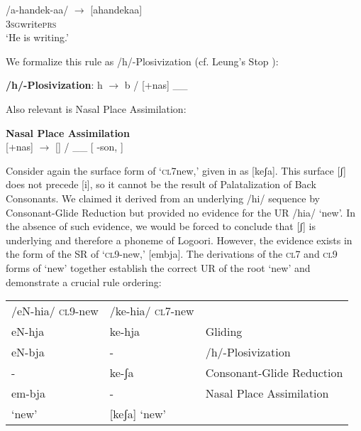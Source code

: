 \documentclass[output=paper]{langsci/langscibook}
\begin{document}
\ex\label{ex:glewwe:14c}{}
/a-handek-aa/  $\rightarrow$  [ahandekaa]\\{}
\textsc{3sg}write\textsc{prs}\\{}
\glt ‘He is writing.’
\z
\z 

We formalize this rule as /h/-Plosivization (cf. Leung’s Stop \citet[117]{Formation1991}):



\ea\label{ex:glewwe:15}{}
\textbf{/h/-Plosivization}: h $\rightarrow$ b / [+nas] \_\_ {\rmfnm}
\z
{}




Also relevant is Nasal Place Assimilation:


\ea\label{ex:glewwe:16}{}
\textbf{Nasal Place Assimilation} \citep[116]{Leung1991}\\{}
[+nas] $\rightarrow$ [] / \_\_ {[} -son,  {]}
\z



Consider again the surface form of ‘\textsc{cl}7new,’ given in  as [keʃa]. This surface [ʃ] does not precede [i], so it cannot be the result of Palatalization of Back Consonants. We claimed it derived from an underlying /hi/ sequence by Consonant-Glide Reduction but provided no evidence for the UR /hia/ ‘new’. In the absence of such evidence, we would be forced to conclude that [ʃ] is underlying and therefore a phoneme of Logoori. However, the evidence exists in the form of the SR of ‘\textsc{cl}9-new,’ [embja]. The derivations of the \textsc{cl}7 and \textsc{cl}9 forms of ‘new’ together establish the correct UR of the root ‘new’ and demonstrate a crucial rule ordering:


\ea\label{ex:glewwe:17}{}
\begin{tabular}{lll}
/eN-hia/
 \textsc{cl9}-new & /ke-hia/  \textsc{cl7}-new & \\
eN-hja   &   ke-hja    &    Gliding\\
eN-bja   &   {}-   &     /h/-Plosivization\\
{}-    &    ke-ʃa     &   Consonant-Glide Reduction\\
em-bja  &    {}-     &   Nasal Place Assimilation\\
[embja]  ‘new’  &  [keʃa]     ‘new’
\end{tabular}
\z
\end{document}
